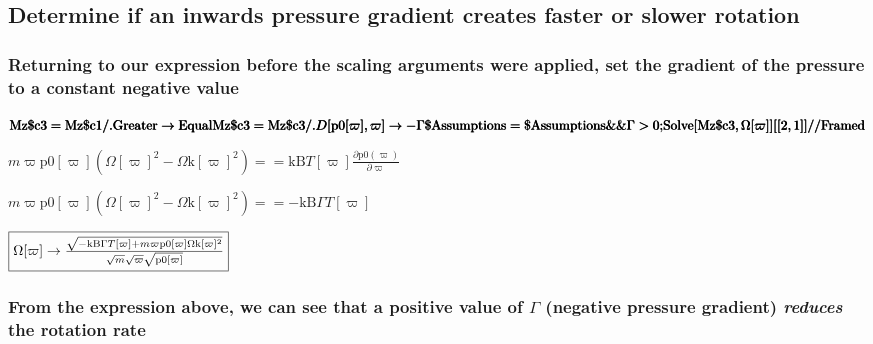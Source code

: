 \documentclass{article}
\begin{document}
\subsection*{Determine if an inwards pressure gradient creates faster or slower rotation}

\subsubsection*{Returning to our expression before the scaling arguments were applied, set the gradient of the pressure to a constant negative value}

\begin{doublespace}
\noindent\(\pmb{\text{Mz$\$$c3} = \text{Mz$\$$c1} \text{/.} \text{Greater} \to  \text{Equal}}\\
\pmb{\text{Mz$\$$c3} = \text{Mz$\$$c3} \text{/.}D[\text{p0}[\varpi ],\varpi ]\to  -\Gamma }\\
\pmb{\text{$\$$Assumptions} = \text{$\$$Assumptions} \&\& \Gamma  > 0;}\\
\pmb{\text{Solve}[\text{Mz$\$$c3}, \Omega [\varpi ]][[2,1]] \text{//}\text{Framed}}\)
\end{doublespace}

\begin{doublespace}
\noindent\(m \varpi  \text{p0}[\varpi ] \left(\Omega [\varpi ]^2-\text{$\Omega $k}[\varpi ]^2\right)==\text{kB} T[\varpi ] \frac{\partial \text{p0}(\varpi
)}{\partial \varpi }\)
\end{doublespace}

\begin{doublespace}
\noindent\(m \varpi  \text{p0}[\varpi ] \left(\Omega [\varpi ]^2-\text{$\Omega $k}[\varpi ]^2\right)==-\text{kB} \Gamma  T[\varpi ]\)
\end{doublespace}

\begin{doublespace}
\noindent\(\fbox{$\Omega [\varpi ]\to \frac{\sqrt{-\text{kB} \Gamma  T[\varpi ]+m \varpi  \text{p0}[\varpi ] \text{$\Omega $k}[\varpi ]^2}}{\sqrt{m}
\sqrt{\varpi } \sqrt{\text{p0}[\varpi ]}}$}\)
\end{doublespace}

\subsubsection*{From the expression above, we can see that a positive value of $\Gamma $ (negative pressure gradient) \textit{ reduces }the rotation
rate}
\end{document}
